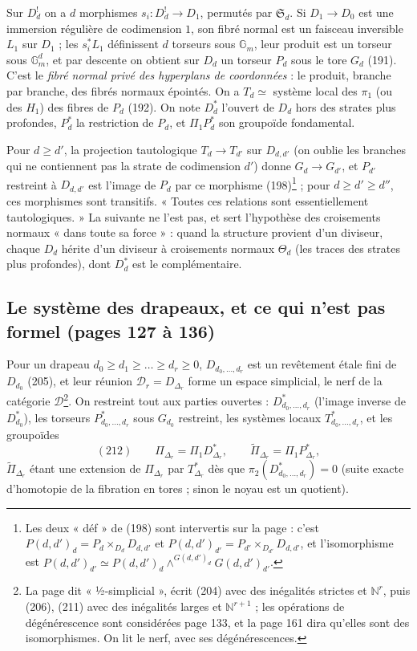 \documentclass[11pt,a4paper]{article}
\begin{document}
Sur $D^{!}_d$ on a $d$ morphismes $s_i : D^{!}_d \to D_1$, permutés par
$\mathfrak{S}_d$. Si $D_1 \to D_0$ est une immersion régulière de codimension $1$,
son fibré normal est un faisceau inversible $L_1$ sur $D_1$ ; les $s_i^* L_1$
définissent $d$ torseurs sous $\mathbb{G}_m$, leur produit est un torseur sous
$\mathbb{G}_m^d$, et par descente on obtient sur $D_d$ un torseur $P_d$ sous le
tore $G_d$ (191). C'est le \emph{fibré normal privé des hyperplans de
coordonnées} : le produit, branche par branche, des fibrés normaux épointés. On
a $T_d \simeq$ système local des $\pi_1$ (ou des $H_1$) des fibres de $P_d$ (192).
On note $D^{*}_d$ l'ouvert de $D_d$ hors des strates plus profondes, $P^{*}_d$ la
restriction de $P_d$, et $\Pi_1 P^{*}_d$ son groupoïde fondamental.

Pour $d \geq d'$, la projection tautologique $T_d \to T_{d'}$ sur $D_{d,d'}$ (on
oublie les branches qui ne contiennent pas la strate de codimension $d'$) donne
$G_d \to G_{d'}$, et $P_{d'}$ restreint à $D_{d,d'}$ est l'image de $P_d$ par ce
morphisme (198)\footnote{Les deux « déf » de (198) sont intervertis sur la page :
c'est $P(d,d')_d = P_d \times_{D_d} D_{d,d'}$ et $P(d,d')_{d'} = P_{d'}
\times_{D_{d'}} D_{d,d'}$, et l'isomorphisme est $P(d,d')_{d'} \simeq P(d,d')_d
\wedge^{G(d,d')_d} G(d,d')_{d'}$.} ; pour $d \geq d' \geq d''$, ces morphismes sont
transitifs. « Toutes ces relations sont essentiellement tautologiques. » La
suivante ne l'est pas, et sert l'hypothèse des croisements normaux « dans toute
sa force » : quand la structure provient d'un diviseur, chaque $D_d$ hérite d'un
diviseur à croisements normaux $\Theta_d$ (les traces des strates plus profondes),
dont $D^{*}_d$ est le complémentaire.

\subsection*{Le système des drapeaux, et ce qui n'est pas formel (pages 127 à 136)}

Pour un drapeau $d_0 \geq d_1 \geq \dots \geq d_r \geq 0$, $D_{d_0, \dots, d_r}$
est un revêtement étale fini de $D_{d_0}$ (205), et leur réunion $\mathcal{D}_r =
D_{\Delta_r}$ forme un espace simplicial, le nerf de la catégorie
$\mathcal{D}$\footnote{La page dit « ½-simplicial », écrit (204) avec des
inégalités strictes et $\mathbb{N}^r$, puis (206), (211) avec des inégalités larges
et $\mathbb{N}^{r+1}$ ; les opérations de dégénérescence sont considérées page 133,
et la page 161 dira qu'elles sont des isomorphismes. On lit le nerf, avec ses
dégénérescences.}. On restreint tout aux parties ouvertes : $D^{*}_{d_0, \dots,
d_r}$ (l'image inverse de $D^{*}_{d_0}$), les torseurs $P^{*}_{d_0, \dots, d_r}$
sous $G_{d_0}$ restreint, les systèmes locaux $T^{*}_{d_0, \dots, d_r}$, et les
groupoïdes
\[
(212) \qquad \Pi_{\Delta_r} = \Pi_1 D^{*}_{\Delta_r}, \qquad
\widetilde{\Pi}_{\Delta_r} = \Pi_1 P^{*}_{\Delta_r},
\]
$\widetilde{\Pi}_{\Delta_r}$ étant une extension de $\Pi_{\Delta_r}$ par
$T^{*}_{\Delta_r}$ dès que $\pi_2(D^{*}_{d_0, \dots, d_r}) = 0$ (suite exacte
d'homotopie de la fibration en tores ; sinon le noyau est un quotient).
\end{document}
